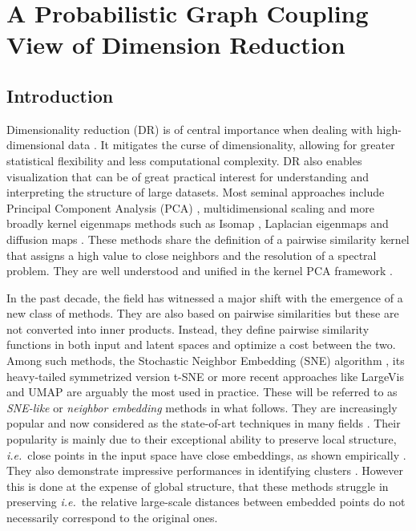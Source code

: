 
\chapter{A Probabilistic Graph Coupling View of Dimension Reduction}
\label{Chapter_GraphCoupling}

\section{Introduction}\label{intro}

Dimensionality reduction (DR) is of central importance when dealing with high-dimensional data \citep{donoho2000high}. It mitigates the curse of dimensionality, allowing for greater statistical flexibility and less computational complexity. DR also enables visualization that can be of great practical interest for understanding and interpreting the structure of large datasets.
Most seminal approaches include Principal Component Analysis (PCA) \cite{pearson1901liii},  multidimensional scaling \cite{kruskal1978multidimensional} and more broadly kernel eigenmaps methods such as Isomap \cite{balasubramanian2002isomap}, Laplacian eigenmaps \citep{belkin2003laplacian} and diffusion maps \citep{coifman2006diffusion}. These methods share the definition of a pairwise similarity kernel that assigns a high value to close neighbors and the resolution of a spectral problem. They are well understood and unified in the kernel PCA framework \citep{ham2004kernel}.

In the past decade, the field has witnessed a major shift with the emergence of a new class of methods. They are also based on pairwise similarities but these are not converted into inner products. Instead, they define pairwise similarity functions in both input and latent spaces and optimize a cost between the two. Among such methods, the Stochastic Neighbor Embedding (SNE) algorithm \cite{NIPS2002SNE}, its heavy-tailed symmetrized version t-SNE \cite{maaten2008tSNE} or more recent approaches like LargeVis \cite{tang2016visualizing} and UMAP \cite{mcinnes2018umap} are arguably the most used in practice. These will be referred to as \textit{SNE-like} or \textit{neighbor embedding} methods in what follows. They are increasingly popular and now considered as the state-of-art techniques in many fields \cite{li2017application,kobak2019art,anders2018dissecting}. Their popularity is mainly due to their exceptional ability to preserve local structure, \textit{i.e.}\ close points in the input space have close embeddings, as shown empirically \cite{wang2021understanding}. They also demonstrate impressive performances in identifying clusters \cite{arora2018analysis, linderman2019clustering}. However this is done at the expense of global structure, that these methods struggle in preserving \cite{wattenberg2016use, coenen2019understanding} \textit{i.e.}\ the relative large-scale distances between embedded points do not necessarily correspond to the original ones. 

